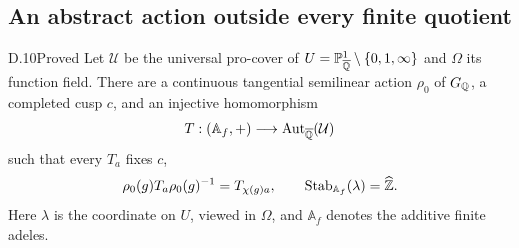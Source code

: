 \subsection{An abstract action outside every finite quotient}

\begin{claim}{D.10}{Proved}
Let $\mathcal U$ be the universal pro-cover of
$U=\mathbb P^1_{\overline{\mathbb Q}}\setminus\{0,1,\infty\}$ and
$\Omega$ its function field. There are a continuous tangential
semilinear action $\rho_0$ of $G_\mathbb Q$, a completed cusp $c$, and
an injective homomorphism
\[
 T:(\mathbb A_f,+)\longrightarrow\operatorname{Aut}_{\overline{\mathbb Q}}(\mathcal U)
\]
such that every $T_a$ fixes $c$,
\[
 \rho_0(g)T_a\rho_0(g)^{-1}=T_{\chi(g)a},
 \qquad
 \operatorname{Stab}_{\mathbb A_f}(\lambda)=\widehat{\mathbb Z}.
\]
Here $\lambda$ is the coordinate on $U$, viewed in $\Omega$,
and $\mathbb A_f$ denotes the additive finite adeles.
\end{claim}
